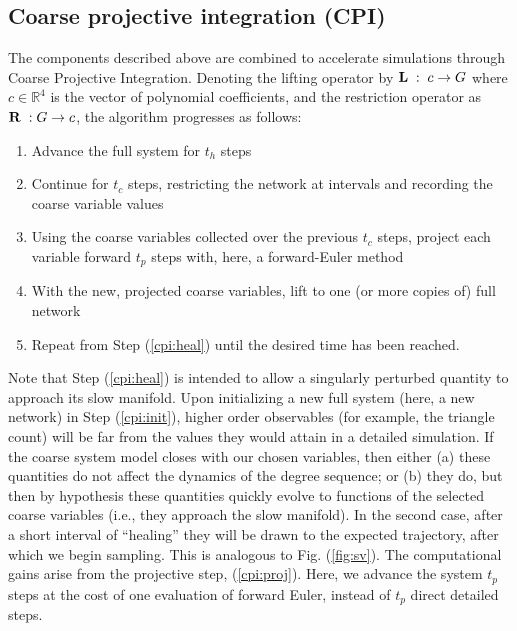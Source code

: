   \subsection{Coarse projective integration (CPI)}
  \label{sec:cpi}

  The components described above are combined to accelerate
  simulations through Coarse Projective Integration.
  Denoting the lifting operator by
  $\mathbf{L} \; : \; c \rightarrow G$ where $c \in \mathbb{R}^4$ is
  the vector of polynomial coefficients, and the restriction operator
  as $\mathbf{R} \; : G \rightarrow c$, the algorithm progresses as
  follows:

  \begin{enumerate}
  \item Advance the full system for $t_h$ steps
    \label{cpi:heal}
  \item Continue for $t_c$ steps, restricting the network at intervals
    and recording the coarse variable values
  \item Using the coarse variables collected over the previous $t_c$
    steps, project each variable forward $t_p$ steps with, here, a
    forward-Euler method
    \label{cpi:proj}
  \item With the new, projected coarse variables, lift to one (or more
    copies of) full network
    \label{cpi:init}
  \item Repeat from Step (\ref{cpi:heal}) until the desired time has
    been reached.
  \end{enumerate}

  Note that Step (\ref{cpi:heal}) is intended to allow a singularly
  perturbed quantity to approach its slow manifold.
  Upon initializing a new full system (here, a new network) in Step
  (\ref{cpi:init}), higher order observables (for example, the
  triangle count) will be far from the values they would attain in a
  detailed simulation.
  If the coarse system model closes with our chosen variables, then
  either (a) these quantities do not affect the dynamics of the degree
  sequence; or (b) they do, but then by hypothesis these quantities
  quickly evolve to functions of the selected coarse variables (i.e.,
  they approach the slow manifold).
  In the second case, after a short interval of ``healing'' they will
  be drawn to the expected trajectory, after which we begin sampling.
  This is analogous to Fig. (\ref{fig:sv}).
  The computational gains arise from the projective step,
  (\ref{cpi:proj}).
  Here, we advance the system $t_p$ steps at the cost of one
  evaluation of forward Euler, instead of $t_p$ direct detailed steps.

